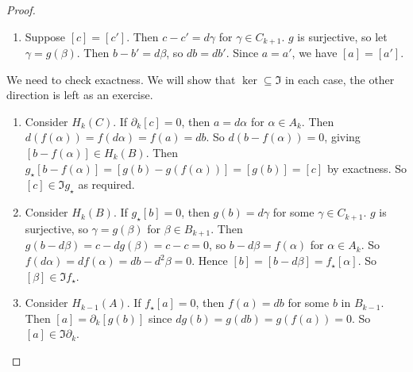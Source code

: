 \begin{proof}
\begin{enumerate}
		\item Suppose \( [c] = [c'] \).
			Then \( c - c' = d\gamma \) for \( \gamma \in C_{k+1} \).
			\( g \) is surjective, so let \( \gamma = g(\beta) \).
			Then \( b - b' = d\beta \), so \( db = db' \).
			Since \( a = a' \), we have \( [a] = [a'] \).
	\end{enumerate}
	We need to check exactness.
	We will show that \( \ker \subseteq \Im \) in each case, the other direction is left as an exercise.
	\begin{enumerate}
		\item Consider \( H_k(C) \).
			If \( \partial_k[c] = 0 \), then \( a = d\alpha \) for \( \alpha \in A_k \).
			Then \( d(f(\alpha)) = f(d\alpha) = f(a) = db \).
			So \( d(b - f(\alpha)) = 0 \), giving \( [b - f(\alpha)] \in H_k(B) \).
			Then \( g_\star[b-f(\alpha)] = [g(b) - g(f(\alpha))] = [g(b)] = [c] \) by exactness.
			So \( [c] \in \Im g_\star \) as required.
		\item Consider \( H_k(B) \).
			If \( g_\star[b] = 0 \), then \( g(b) = d\gamma \) for some \( \gamma \in C_{k+1} \).
			\( g \) is surjective, so \( \gamma = g(\beta) \) for \( \beta \in B_{k+1} \).
			Then \( g(b - d\beta) = c - dg(\beta) = c - c = 0 \), so \( b - d\beta = f(\alpha) \) for \( \alpha \in A_k \).
			So \( f(d\alpha) = df(\alpha) = db - d^2\beta = 0 \).
			Hence \( [b] = [b - d\beta] = f_\star[\alpha] \).
			So \( [\beta] \in \Im f_\star \).
		\item Consider \( H_{k-1}(A) \).
			If \( f_\star[a] = 0 \), then \( f(a) = db \) for some \( b \) in \( B_{k-1} \).
			Then \( [a] = \partial_k [g(b)] \) since \( dg(b) = g(db) = g(f(a)) = 0 \).
			So \( [a] \in \Im \partial_k \).
	\end{enumerate}
\end{proof}
